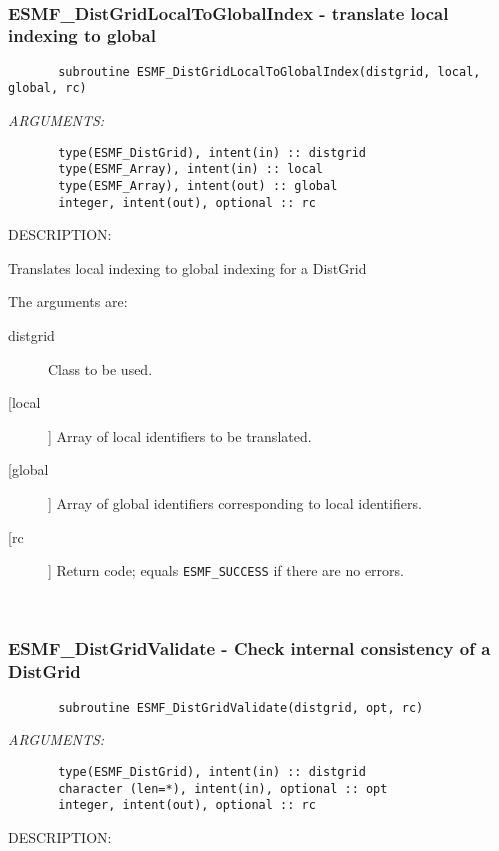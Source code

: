  
\mbox{}\hrulefill\ 
 
\subsubsection{ESMF\_DistGridLocalToGlobalIndex - translate local indexing to global}


 
\begin{verbatim}       subroutine ESMF_DistGridLocalToGlobalIndex(distgrid, local, global, rc)\end{verbatim}{\em ARGUMENTS:}
\begin{verbatim}       type(ESMF_DistGrid), intent(in) :: distgrid
       type(ESMF_Array), intent(in) :: local
       type(ESMF_Array), intent(out) :: global
       integer, intent(out), optional :: rc\end{verbatim}
{\sf DESCRIPTION:\\ }


       Translates local indexing to global indexing for a DistGrid
  
       The arguments are:
       \begin{description}
       \item[distgrid] 
            Class to be used.
       \item[[local]]
            Array of local identifiers to be translated.
       \item[[global]]
            Array of global identifiers corresponding to local identifiers.
       \item[[rc]] 
            Return code; equals {\tt ESMF\_SUCCESS} if there are no errors.
       \end{description}
   
 
\mbox{}\hrulefill\ 
 
\subsubsection{ESMF\_DistGridValidate - Check internal consistency of a DistGrid}


 
\begin{verbatim}       subroutine ESMF_DistGridValidate(distgrid, opt, rc)\end{verbatim}{\em ARGUMENTS:}
\begin{verbatim}       type(ESMF_DistGrid), intent(in) :: distgrid       
       character (len=*), intent(in), optional :: opt    
       integer, intent(out), optional :: rc            \end{verbatim}
{\sf DESCRIPTION:\\ }



